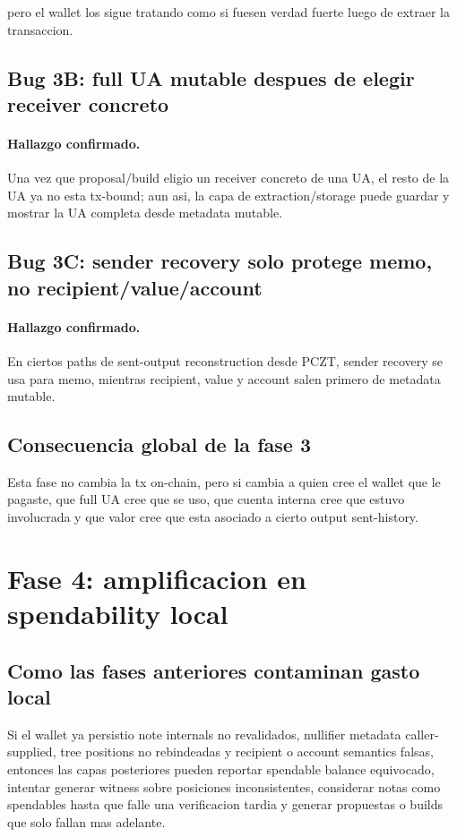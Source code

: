 \documentclass[11pt,a4paper]{article}
\begin{document}
pero el wallet los sigue tratando como si fuesen verdad fuerte luego de
extraer la transaccion.

\subsection{Bug 3B: full UA mutable despues de elegir receiver concreto}

\paragraph{Hallazgo confirmado.}
Una vez que proposal/build eligio un receiver concreto de una UA, el resto de
la UA ya no esta tx-bound; aun asi, la capa de extraction/storage puede
guardar y mostrar la UA completa desde metadata mutable.

\subsection{Bug 3C: sender recovery solo protege memo, no recipient/value/account}

\paragraph{Hallazgo confirmado.}
En ciertos paths de sent-output reconstruction desde PCZT, sender recovery se
usa para memo, mientras recipient, value y account salen primero de metadata
mutable.

\subsection{Consecuencia global de la fase 3}

Esta fase no cambia la tx on-chain, pero si cambia a quien cree el wallet que
le pagaste, que full UA cree que se uso, que cuenta interna cree que estuvo
involucrada y que valor cree que esta asociado a cierto output sent-history.

\section{Fase 4: amplificacion en spendability local}

\subsection{Como las fases anteriores contaminan gasto local}

Si el wallet ya persistio note internals no revalidados, nullifier metadata
caller-supplied, tree positions no rebindeadas y recipient o account semantics
falsas, entonces las capas posteriores pueden reportar spendable balance
equivocado, intentar generar witness sobre posiciones inconsistentes,
considerar notas como spendables hasta que falle una verificacion tardia y
generar propuestas o builds que solo fallan mas adelante.
\end{document}
